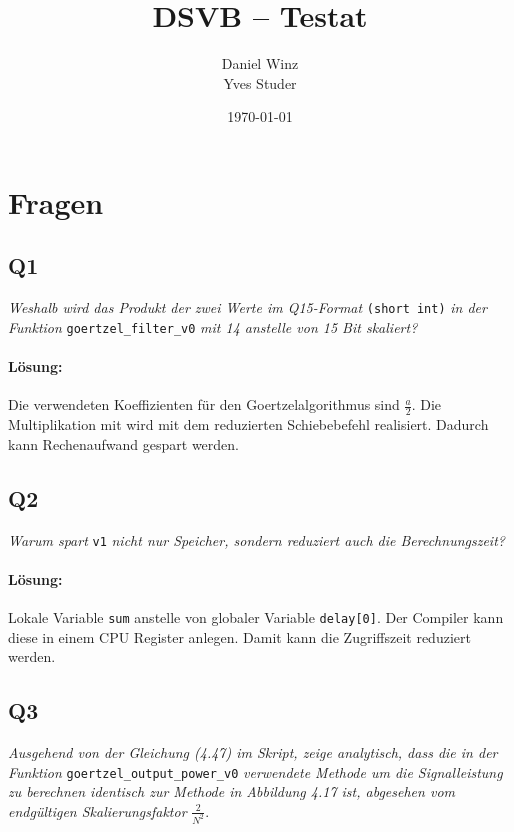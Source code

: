 \documentclass[a4,paper,fleqn]{article}
\title{DSVB -- Testat}
\date{\today}
\author{Daniel Winz\\Yves Studer}
\begin{document}
\maketitle
\clearpage

\section{Fragen}

\subsection{Q1}
\label{q1}
\emph{Weshalb wird das Produkt der zwei Werte im Q15-Format}
\verb?(short int)?
\emph{in der Funktion}
\verb?goertzel_filter_v0?
\emph{mit 14 anstelle von 15 Bit skaliert? }
\paragraph{Lösung: }
Die verwendeten Koeffizienten für den Goertzelalgorithmus sind $\frac{a}{2}$. 
Die Multiplikation mit wird mit dem reduzierten Schiebebefehl realisiert. 
Dadurch kann Rechenaufwand gespart werden. 
\subsection{Q2}
\label{q2}
\emph{Warum spart}
\verb?v1?
\emph{nicht nur Speicher, sondern reduziert auch die 
Berechnungszeit?}
\paragraph{Lösung: }
Lokale Variable \verb?sum? anstelle von globaler Variable \verb?delay[0]?. Der 
Compiler kann diese in einem CPU Register anlegen. Damit kann die Zugriffszeit 
reduziert werden. 

\subsection{Q3}
\label{q3}
\emph{Ausgehend von der Gleichung (4.47) im Skript, zeige analytisch, dass die 
in der Funktion}
\verb?goertzel_output_power_v0?
\emph{verwendete Methode um die Signalleistung zu berechnen identisch zur 
Methode in Abbildung 4.17 ist, abgesehen vom endgültigen Skalierungsfaktor}
$\frac{2}{N^2}$.
\end{document}
